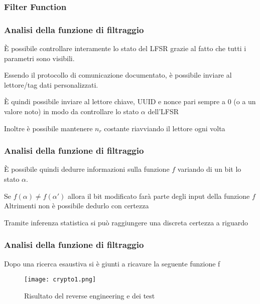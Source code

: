 \subsubsection{Filter Function}
\begin{frame}
    \frametitle{Analisi della funzione di filtraggio}\label{sec:filter-fn}
    È possibile controllare interamente lo stato del LFSR grazie al fatto che tutti i parametri sono visibili.\pause

    Essendo il protocollo di comunicazione documentato, è possibile inviare al lettore/tag dati personalizzati.\pause

    È quindi possibile inviare al lettore chiave, UUID e nonce pari sempre a 0 (o a un valore noto) in modo da controllare lo stato $\alpha$ dell'LFSR \pause

    Inoltre è possibile mantenere $n_r$ costante riavviando il lettore ogni volta
\end{frame}

\begin{frame}
    \frametitle{Analisi della funzione di filtraggio}
    È possibile quindi dedurre informazioni sulla funzione $f$ variando di un bit lo stato $\alpha$.\pause

    Se $f(\alpha) \neq f(\alpha')$ allora il bit modificato farà parte degli input della funzione $f$
    Altrimenti non è possibile dedurlo con certezza\pause

    Tramite inferenza statistica si può raggiungere una discreta certezza a riguardo
\end{frame}
\note{
    
}
\begin{frame}
    \frametitle{Analisi della funzione di filtraggio}
    Dopo una ricerca esaustiva si è giunti a ricavare la seguente funzione f
    \begin{figure}
        \centering
        \texttt{[image: crypto1.png]}
        \caption{Risultato del reverse engineering e dei test\cite{garcia2008dismantling}}
        \label{fig:crypto1}
    \end{figure}
\end{frame}
